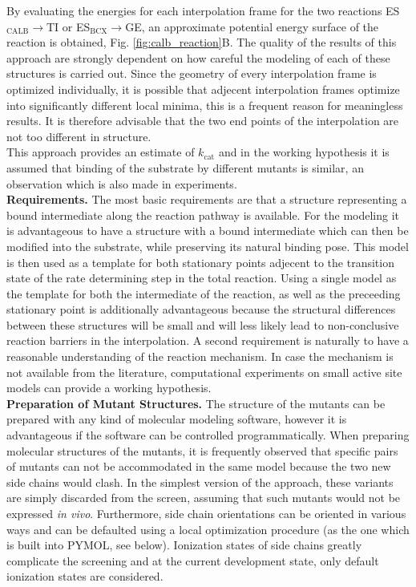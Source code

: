 By evaluating the energies for each interpolation frame for the two reactions ES$_\text{CALB}\rightarrow$TI or ES$_\text{BCX}\rightarrow$GE, an approximate potential energy surface of the reaction is obtained, Fig. \ref{fig:calb_reaction}B.
The quality of the results of this approach are strongly dependent on how careful the modeling of each of these structures is carried out.
Since the geometry of every interpolation frame is optimized individually, it is possible that adjecent interpolation frames optimize into significantly different local minima, this is a frequent reason for meaningless results.
It is therefore advisable that the two end points of the interpolation are not too different in structure.\\
This approach provides an estimate of $k_\text{cat}$ and in the working hypothesis it is assumed that binding of the substrate by different mutants is similar, an observation which is also made in experiments\cite{ludwiczek2013strategies}.\\
\textbf{Requirements.}
The most basic requirements are that a structure representing a bound intermediate along the reaction pathway is available.
For the modeling it is advantageous to have a structure with a bound intermediate which can then be modified into the substrate, while preserving its natural binding pose.
This model is then used as a template for both stationary points adjecent to the transition state of the rate determining step in the total reaction.
Using a single model as the template for both the intermediate of the reaction, as well as the preceeding stationary point is additionally advantageous because the structural differences between these structures will be small and will less likely lead to non-conclusive reaction barriers in the interpolation.
A second requirement is naturally to have a reasonable understanding of the reaction mechanism.
In case the mechanism is not available from the literature, computational experiments on small active site models can provide a working hypothesis.\\
\textbf{Preparation of Mutant Structures.}
The structure of the mutants can be prepared with any kind of molecular modeling software, however it is advantageous if the software can be controlled programmatically.
When preparing molecular structures of the mutants, it is frequently observed that specific pairs of mutants can not be accommodated in the same model because the two new side chains would clash.
In the simplest version of the approach, these variants are simply discarded from the screen, assuming that such mutants would not be expressed \textit{in vivo}.
Furthermore, side chain orientations can be oriented in various ways and can be defaulted using a local optimization procedure (as the one which is built into PYMOL, see below).
Ionization states of side chains greatly complicate the screening and at the current development state, only default ionization states are considered.

